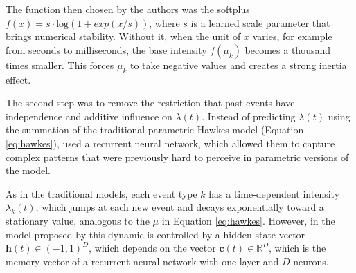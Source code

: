     The function then chosen by the authors was the softplus $f(x) = s \cdot \mathrm{log}(1 + exp(x/s))$, where $s$ is a learned scale parameter that brings numerical stability. Without it, when the unit of $x$ varies, for example from seconds to milliseconds, the base intensity $f(\mu_k)$ becomes a thousand times smaller. This forces $\mu_k$ to take negative values and creates a strong inertia effect.

    The second step was to remove the restriction that past events have independence and additive influence on $\lambda(t)$. Instead of predicting $\lambda(t)$ using the summation of the traditional parametric Hawkes model (Equation \eqref{eq:hawkes}),  used a recurrent neural network, which allowed them to capture complex patterns that were previously hard to perceive in parametric versions of the model.

    As in the traditional models, each event type $k$ has a time-dependent intensity $\lambda_k(t)$, which jumps at each new event and decays exponentially toward a stationary value, analogous to the $\mu$ in Equation \eqref{eq:hawkes}. However, in the model proposed by  this dynamic is controlled by a hidden state vector $\mathbf{h}(t) \in (-1,1)^D$, which depends on the vector $\mathbf{c}(t) \in \mathbb{R}^D$, which is the memory vector of a recurrent neural network with one layer and $D$ neurons.

